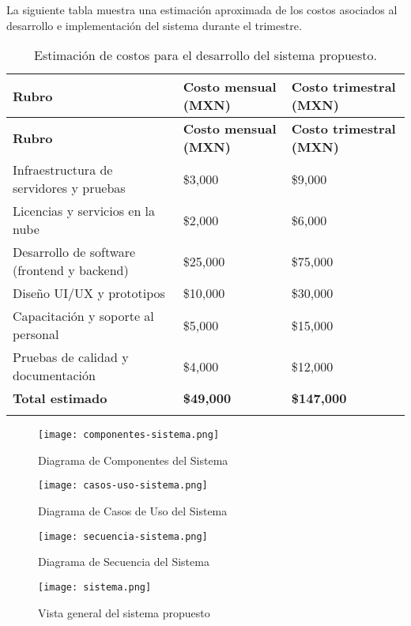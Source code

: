 La siguiente tabla muestra una estimación aproximada de los costos asociados al desarrollo e implementación del sistema durante el trimestre.

\begin{longtable}{|p{}|p{}|p{}|}
\hline
\textbf{Rubro} & \textbf{Costo mensual (MXN)} & \textbf{Costo trimestral (MXN)} \\
\hline
\endfirsthead

\hline
\textbf{Rubro} & \textbf{Costo mensual (MXN)} & \textbf{Costo trimestral (MXN)} \\
\hline
\endhead

Infraestructura de servidores y pruebas & \$3,000 & \$9,000 \\
\hline
Licencias y servicios en la nube & \$2,000 & \$6,000 \\
\hline
Desarrollo de software (frontend y backend) & \$25,000 & \$75,000 \\
\hline
Diseño UI/UX y prototipos & \$10,000 & \$30,000 \\
\hline
Capacitación y soporte al personal & \$5,000 & \$15,000 \\
\hline
Pruebas de calidad y documentación & \$4,000 & \$12,000 \\
\hline
\textbf{Total estimado} & \textbf{\$49,000} & \textbf{\$147,000} \\
\hline
\caption{Estimación de costos para el desarrollo del sistema propuesto.}
\label{tabla:costos}
\end{longtable}



\begin{figure}[H]
    \centering
    \texttt{[image: componentes-sistema.png]}
    \caption{Diagrama de Componentes del Sistema}
    \label{fig:componentes-sistema}
\end{figure}


\begin{figure}[H]
    \centering
    \texttt{[image: casos-uso-sistema.png]}
    \caption{Diagrama de Casos de Uso del Sistema}
    \label{fig:casos-uso}
\end{figure}


\begin{figure}[H]
    \centering
    \texttt{[image: secuencia-sistema.png]}
    \caption{Diagrama de Secuencia del Sistema}
    \label{fig:secuencia-sistema}
\end{figure}


\begin{figure}[H]
    \centering
    \texttt{[image: sistema.png]}
    \caption{Vista general del sistema propuesto}
    \label{fig:vista-general}
\end{figure}